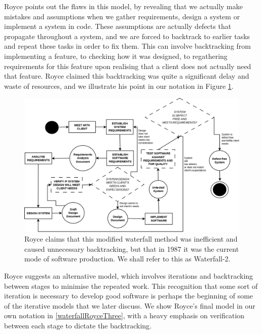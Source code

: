 Royce points out the flaws in this model, by revealing that we actually make mistakes and
assumptions when we gather requirements, design a system or implement a system in code.
These assumptions are actually defects that propagate throughout a system, and we are forced to
backtrack to earlier tasks and repeat these tasks in order to fix them.
This can involve backtracking from implementing a feature, to checking how it was designed, to
regathering requirements for this feature upon realising that a client does not actually need that
feature.
Royce claimed this backtracking was quite a significant delay and waste of resources, and we
illustrate his point in our notation in Figure \ref{waterfallRoyceTwo}.

\begin{figure}[ht!]
	\centering
	\includegraphics[scale=0.3]{media/WaterfallRoyceTwo}
	\caption{Royce claims that this modified waterfall method was inefficient and caused unnecessary
		backtracking, but that in 1987 it was the current mode of software
      production. We shall refer to this as Waterfall-2.}
	\label{waterfallRoyceTwo}
\end{figure}

Royce suggests an alternative model, which involves iterations and backtracking between stages to
minimise the repeated work.
This recognition that some sort of iteration is necessary to develop good software is perhaps the
beginning of some of the iterative models that we later discuss.
We show Royce's final model in our own notation in \ref{waterfallRoyceThree}, with a heavy emphasis
on verification between each stage to dictate the backtracking.

\pagebreak

